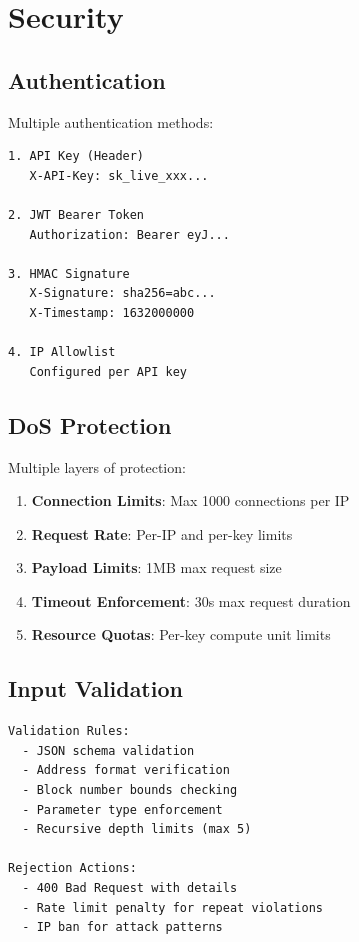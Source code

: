 \documentclass[11pt,a4paper]{article}
\begin{document}
\section{Security}

\subsection{Authentication}

Multiple authentication methods:

\begin{lstlisting}
1. API Key (Header)
   X-API-Key: sk_live_xxx...

2. JWT Bearer Token
   Authorization: Bearer eyJ...

3. HMAC Signature
   X-Signature: sha256=abc...
   X-Timestamp: 1632000000

4. IP Allowlist
   Configured per API key
\end{lstlisting}

\subsection{DoS Protection}

Multiple layers of protection:

\begin{enumerate}
    \item \textbf{Connection Limits}: Max 1000 connections per IP
    \item \textbf{Request Rate}: Per-IP and per-key limits
    \item \textbf{Payload Limits}: 1MB max request size
    \item \textbf{Timeout Enforcement}: 30s max request duration
    \item \textbf{Resource Quotas}: Per-key compute unit limits
\end{enumerate}

\subsection{Input Validation}

\begin{lstlisting}
Validation Rules:
  - JSON schema validation
  - Address format verification
  - Block number bounds checking
  - Parameter type enforcement
  - Recursive depth limits (max 5)

Rejection Actions:
  - 400 Bad Request with details
  - Rate limit penalty for repeat violations
  - IP ban for attack patterns
\end{lstlisting}
\end{document}
